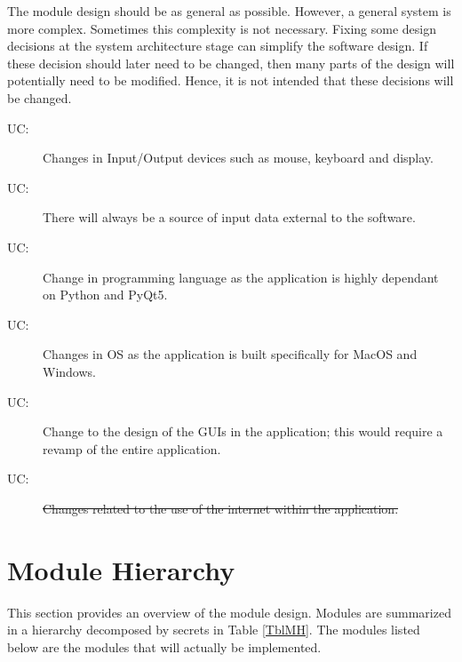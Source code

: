 \documentclass[12pt, titlepage]{article}
\newcounter{ucnum}
\newcommand{\uctheucnum}{UC\theucnum}
\begin{document}
The module design should be as general as possible. However, a general system is
more complex. Sometimes this complexity is not necessary. Fixing some design
decisions at the system architecture stage can simplify the software design. If
these decision should later need to be changed, then many parts of the design
will potentially need to be modified. Hence, it is not intended that these
decisions will be changed.

\begin{description}
\item[ \uctheucnum \label{ucIO}:] Changes in Input/Output devices such as mouse, keyboard and display.
\item[ \uctheucnum \label{ucInput}:] There will always be
  a source of input data external to the software.
\item[ \uctheucnum \label{ucPL}:] Change in programming language as the application is highly dependant on Python and PyQt5.
\item[ \uctheucnum \label{ucOS}:] Changes in OS as the application is built specifically for MacOS and Windows.
\item[ \uctheucnum \label{ucGUI}:] Change to the design of the GUIs in the application; this would require a revamp of the entire application.
\item [ \uctheucnum \label{ucI}:]\sout {Changes related to the use of the internet within the application.}
\end{description}

\section{Module Hierarchy} \label{SecMH}

This section provides an overview of the module design. Modules are summarized
in a hierarchy decomposed by secrets in Table \ref{TblMH}. The modules listed
below are the modules that will actually be implemented.
\end{document}
